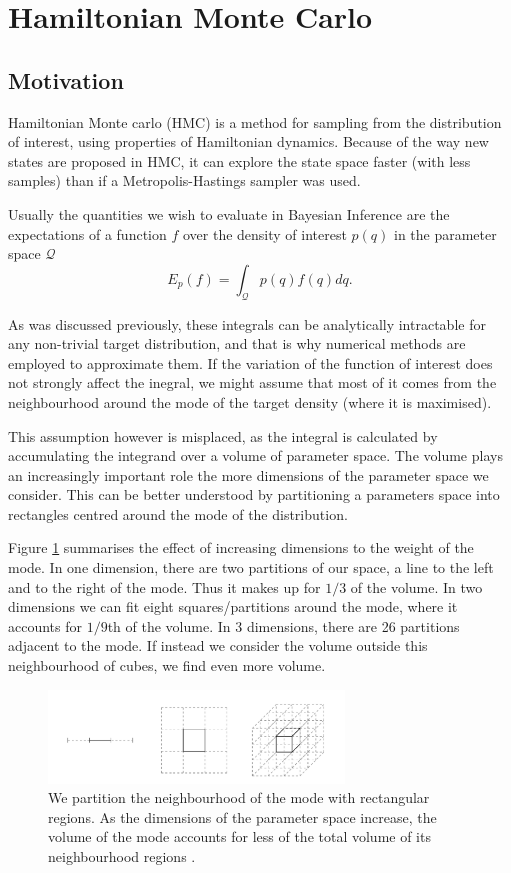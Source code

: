 \section{Hamiltonian Monte Carlo}
\label{section:hmc}
\subsection{Motivation}

Hamiltonian Monte carlo (HMC) is a method for sampling from the distribution of interest, using properties of Hamiltonian dynamics. Because of the way new states are proposed in HMC, it can explore the state space faster (with less samples) than if a Metropolis-Hastings sampler was used.

Usually the quantities we wish to evaluate in Bayesian Inference are the expectations of a function $f$ over the density of interest $p(q)$ in the parameter space $\mathcal{Q}$
\begin{equation}
	E_p(f) = \int_{\mathcal{Q}}p(q)f(q)dq.
\end{equation}

As was discussed previously, these integrals can be analytically intractable for any non-trivial target distribution, and that is why numerical methods are employed to approximate them. If the variation of the function of interest does not strongly affect the inegral, we might assume that most of it comes from the neighbourhood around the mode of the target density (where it is maximised).

This assumption however is misplaced, as the integral is calculated by accumulating the integrand over a volume of parameter space. The volume plays an increasingly important role the more dimensions of the parameter space we consider. This can be better understood by partitioning a parameters space into rectangles centred around the mode of the distribution. 

Figure \ref{fig:volume} summarises the effect of increasing dimensions to the weight of the mode. In one dimension, there are two partitions of our space, a line to the left and to the right of the mode. Thus it makes up for $1/3$ of the volume. In two dimensions we can fit eight squares/partitions around the mode, where it accounts for $1/9$th of the volume. In 3 dimensions, there are 26 partitions adjacent to the mode. If instead we consider the volume outside this neighbourhood of cubes, we find even more volume. 

\begin{figure}
	\centering
	\includegraphics[width=0.7\textwidth]{volume}
	\caption{We partition the neighbourhood of the mode with rectangular regions. As the dimensions of the parameter space increase, the volume of the mode accounts for less of the total volume of its neighbourhood regions \cite{betancourt_conceptual_2017}. }
	\label{fig:volume}
\end{figure}

